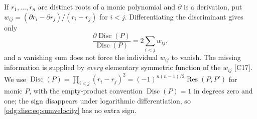 \documentclass[11pt,oneside]{article}
\numberwithin{equation}{section}
\theoremstyle{definition}
\theoremstyle{remark}
\newcommand{\src}[1]{\textup{\textsf{\small[#1]}}}
\newcommand{\Disc}{\operatorname{Disc}}
\newcommand{\Res}{\operatorname{Res}}
\begin{document}
If $r_1,\ldots,r_n$ are distinct roots of a monic polynomial and $\partial$ is a
derivation, put $w_{ij}=(\partial r_i-\partial r_j)/(r_i-r_j)$ for $i<j$. Differentiating
the discriminant gives only
\begin{equation}\label{odg:disc:eq:sumvelocity}
 \frac{\partial\Disc(P)}{\Disc(P)}=2\sum_{i<j}w_{ij},
\end{equation}
and a vanishing sum does not force the individual $w_{ij}$ to vanish. The missing
information is supplied by \emph{every} elementary symmetric function of the $w_{ij}$
\src{C17}. We use $\Disc(P)=\prod_{i<j}(r_i-r_j)^2=(-1)^{n(n-1)/2}\Res(P,P')$ for monic
$P$, with the empty-product convention $\Disc(P)=1$ in degrees zero and one;
the sign disappears under logarithmic differentiation,
so \eqref{odg:disc:eq:sumvelocity} has no extra sign.
\end{document}
